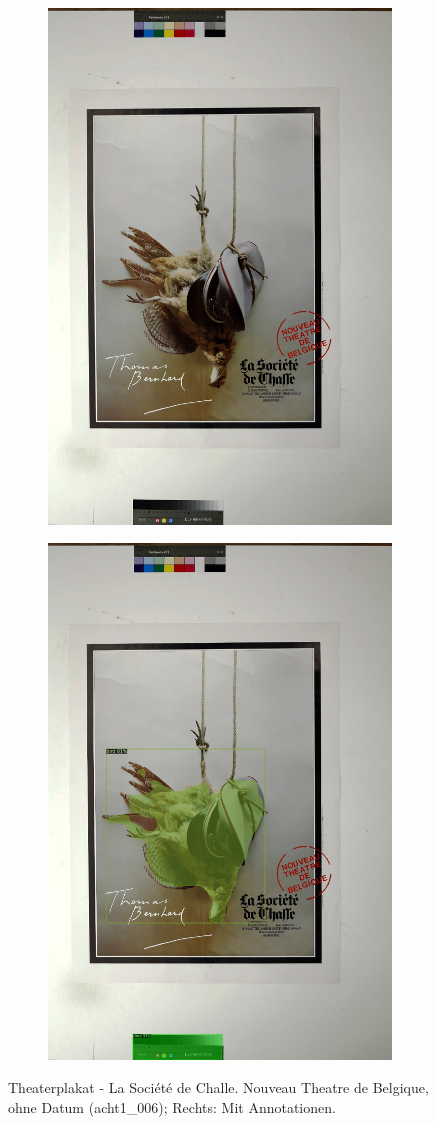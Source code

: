 \documentclass[a4paper,12pt,ngerman]{article}
\begin{document}
\newpage
\begin{landscape}
\begin{figure}[ht]
	\begin{subfigure}[b]{0.5\linewidth}
	\centering
	\includegraphics[height=\linewidth]{Abbildung_17_(acht1_006)}
	\end{subfigure}
	\begin{subfigure}[b]{0.5\linewidth}
	\centering
	\includegraphics[height=\linewidth]{Abbildung_17_(acht1_006)_with_detections}
	\end{subfigure}
	\caption{Theaterplakat - La Société de Challe. Nouveau Theatre de Belgique, ohne Datum (acht1\_006); Rechts: Mit Annotationen.}
\end{figure}
\end{landscape}
\end{document}

